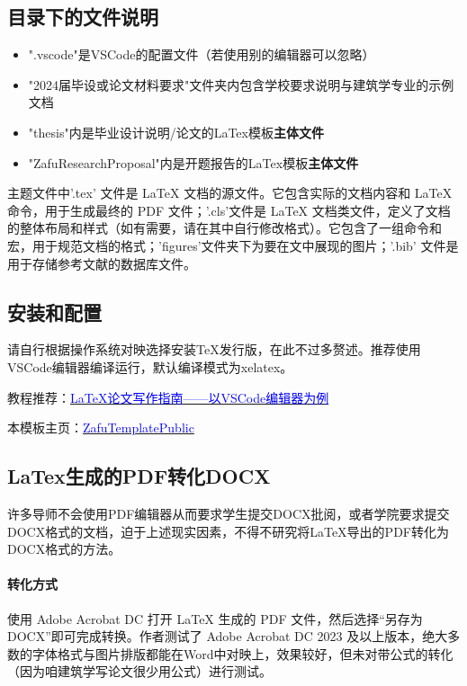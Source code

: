 \documentclass[AutoFakeBold]{ZafuThesis}
\begin{document}
\subsection{目录下的文件说明}
\begin{itemize}
  \item ".vscode"是VSCode的配置文件（若使用别的编辑器可以忽略）
  \item "2024届毕设或论文材料要求"文件夹内包含学校要求说明与建筑学专业的示例文档
  \item "thesis"内是毕业设计说明/论文的LaTex模板{\bfseries 主体文件}
  \item "ZafuResearchProposal"内是开题报告的LaTex模板{\bfseries 主体文件}
\end{itemize}
\par
主题文件中'.tex' 文件是 LaTeX 文档的源文件。它包含实际的文档内容和 LaTeX 命令，用于生成最终的 PDF 文件；'.cls'文件是 LaTeX 文档类文件，定义了文档的整体布局和样式（如有需要，请在其中自行修改格式）。它包含了一组命令和宏，用于规范文档的格式；'figures'文件夹下为要在文中展现的图片；'.bib' 文件是用于存储参考文献的数据库文件。
\subsection{安装和配置}
请自行根据操作系统对映选择安装TeX发行版，在此不过多赘述。推荐使用VSCode编辑器编译运行，默认编译模式为xelatex。\par
教程推荐：\href{https://www.bilibili.com/video/BV12m4y1D7PZ/?vd_source=dfa6f0143619fda15de458493344dd04}{\textcolor{blue}{LaTeX论文写作指南——以VSCode编辑器为例}}\par
本模板主页：\href{https://github.com/Stolorzs/ZafuTemplatePublic}{\textcolor{blue}{ZafuTemplatePublic}}

\subsection{LaTex生成的PDF转化DOCX}
许多导师不会使用PDF编辑器从而要求学生提交DOCX批阅，或者学院要求提交DOCX格式的文档，迫于上述现实因素，不得不研究将LaTeX导出的PDF转化为DOCX格式的方法。\par
\paragraph{转化方式}
使用 Adobe Acrobat DC 打开 LaTeX 生成的 PDF 文件，然后选择“另存为 DOCX”即可完成转换。作者测试了 Adobe Acrobat DC 2023 及以上版本，绝大多数的字体格式与图片排版都能在Word中对映上，效果较好，但未对带公式的转化（因为咱建筑学写论文很少用公式）进行测试。
\end{document}
